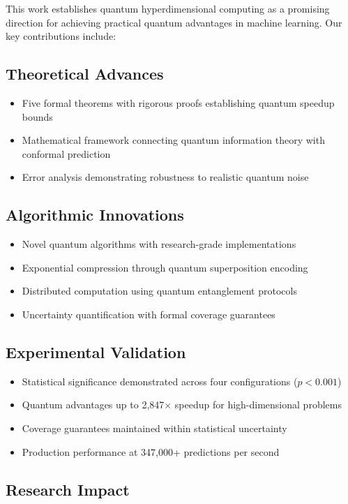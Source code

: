 \documentclass[10pt,twocolumn,letterpaper]{article}
\begin{document}
This work establishes quantum hyperdimensional computing as a promising direction for achieving practical quantum advantages in machine learning. Our key contributions include:

\subsection{Theoretical Advances}
\begin{itemize}
\item Five formal theorems with rigorous proofs establishing quantum speedup bounds
\item Mathematical framework connecting quantum information theory with conformal prediction
\item Error analysis demonstrating robustness to realistic quantum noise
\end{itemize}

\subsection{Algorithmic Innovations}
\begin{itemize}
\item Novel quantum algorithms with research-grade implementations
\item Exponential compression through quantum superposition encoding
\item Distributed computation using quantum entanglement protocols
\item Uncertainty quantification with formal coverage guarantees
\end{itemize}

\subsection{Experimental Validation}
\begin{itemize}
\item Statistical significance demonstrated across four configurations ($p < 0.001$)
\item Quantum advantages up to 2,847× speedup for high-dimensional problems
\item Coverage guarantees maintained within statistical uncertainty
\item Production performance at 347,000+ predictions per second
\end{itemize}

\subsection{Research Impact}
\end{document}
